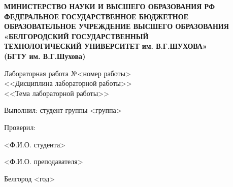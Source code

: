 \begin{titlepage}
\thispagestyle{empty}
\setlength{\parindent}{0ex} %

\begin{center}
  \textbf{МИНИСТЕРСТВО НАУКИ И ВЫСШЕГО ОБРАЗОВАНИЯ РФ\\
ФЕДЕРАЛЬНОЕ ГОСУДАРСТВЕННОЕ БЮДЖЕТНОЕ ОБРАЗОВАТЕЛЬНОЕ УЧРЕЖДЕНИЕ
ВЫСШЕГО ОБРАЗОВАНИЯ\\
«БЕЛГОРОДСКИЙ ГОСУДАРСТВЕННЫЙ\\
ТЕХНОЛОГИЧЕСКИЙ УНИВЕРСИТЕТ им. В.Г.ШУХОВА»\\
(БГТУ им. В.Г.Шухова)
}
\end{center}

\vspace{50mm}

\begin{center}
  Лабораторная работа №<номер работы> \\
  <<Дисциплина лабораторной работы>>\\
  <<Тема лабораторной работы>>
\end{center}

\vspace{40mm}

\begin{minipage}{.60\linewidth}
    Выполнил: студент группы <группа>

    \smallskip

    Проверил:
\end{minipage}
\hfill
\begin{minipage}{.4\linewidth}
  \begin{flushright}
   <Ф.И.О. студента> 

    \smallskip
    <Ф.И.О. преподавателя> 
  \end{flushright}
\end{minipage}

\vfill
\begin{center}
  Белгород <год>
\end{center}

\setlength{\parindent}{1.25cm} %
\end{titlepage}